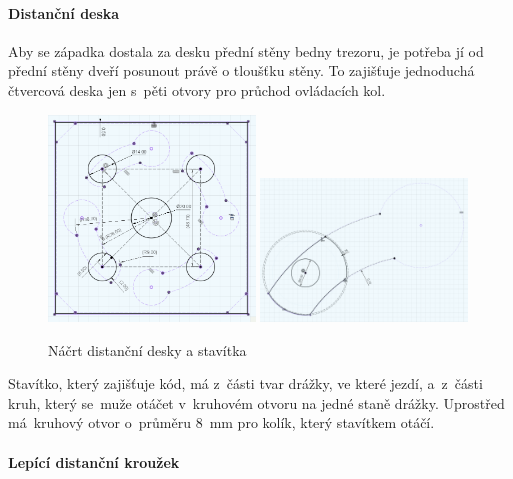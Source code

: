 \newpage

\paragraph{Distanční deska}

Aby se západka dostala za desku přední stěny bedny trezoru, je potřeba jí od přední stěny dveří posunout právě o tloušťku stěny. To zajišťuje jednoduchá čtvercová deska jen s~pěti otvory
pro průchod ovládacích kol.

\begin{figure}[h]
	\centering
    \includegraphics[width=0.49\textwidth]{kapitoly/obrazky/M3/distancka.png}
    \includegraphics[width=0.49\textwidth]{kapitoly/obrazky/M3/kamen.png}
    \caption{Náčrt distanční desky a stavítka}
    \label{fig:M3-kamen}
    \label{fig:M3-distancka}
\end{figure}

Stavítko, který zajišťuje kód, má z~části tvar drážky, ve které jezdí, a~z~části kruh, který se~muže otáčet v~kruhovém otvoru na jedné staně drážky.
Uprostřed má~kruhový otvor o~průměru 8~mm pro kolík, který stavítkem otáčí.

\paragraph{Lepící distanční kroužek}

